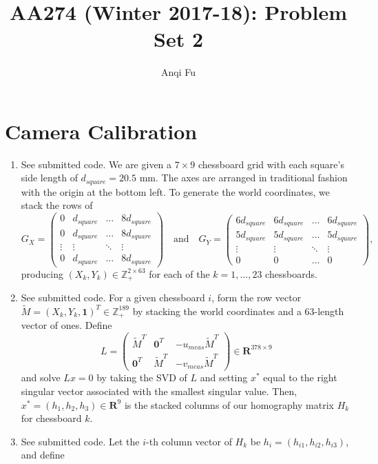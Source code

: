 \documentclass[12pt]{article}
\title{\Large{AA274 (Winter 2017-18): Problem Set 2}}
\author{Anqi Fu}
\begin{document}
	\maketitle

\section{Camera Calibration}
\begin{enumerate}
	\item See submitted code. We are given a $7 \times 9$ chessboard grid with each square's side length of $d_{square} = 20.5$ mm. The axes are arranged in traditional fashion with the origin at the bottom left. To generate the world coordinates, we stack the rows of
		\[
			G_X = \left(\begin{array}{cccc}
				0 & d_{square} & \ldots & 8d_{square} \\
				0 & d_{square} & \ldots & 8d_{square} \\
				\vdots & \vdots & \ddots & \vdots \\
				0 & d_{square} & \ldots & 8d_{square}
			\end{array}\right) \quad \mbox{and} \quad
			G_Y = \left(\begin{array}{cccc}
				6d_{square} & 6d_{square} & \ldots & 6d_{square} \\
				5d_{square} & 5d_{square} & \ldots & 5d_{square} \\
				\vdots & \vdots & \ddots & \vdots \\
				0 & 0 & \ldots & 0
			\end{array}\right),
		\]
	producing $(X_k,Y_k) \in \mathbb{Z}_+^{2 \times 63}$ for each of the $k = 1,\ldots,23$ chessboards.
	\item See submitted code. For a given chessboard $i$, form the row vector $\tilde M = (X_k,Y_k,\mathbf{1})^T \in \mathbb{Z}_+^{189}$ by stacking the world coordinates and a 63-length vector of ones. Define
		\[
			L = \left(\begin{array}{ccc}
				\tilde M^T & \mathbf{0}^T & -u_{meas}\tilde M^T \\
				\mathbf{0}^T & \tilde M^T & -v_{meas}\tilde M^T
				\end{array}\right) \in \mathbf{R}^{378 \times 9}
		\]
		and solve $Lx = 0$ by taking the SVD of $L$ and setting $x^*$ equal to the right singular vector associated with the smallest singular value. Then, $x^* = (h_1, h_2, h_3) \in \mathbf{R}^9$ is the stacked columns of our homography matrix $H_k$ for chessboard $k$.
	\item See submitted code. Let the $i$-th column vector of $H_k$ be $h_i = (h_{i1}, h_{i2}, h_{i3})$, and define

\end{enumerate}
\end{document}
